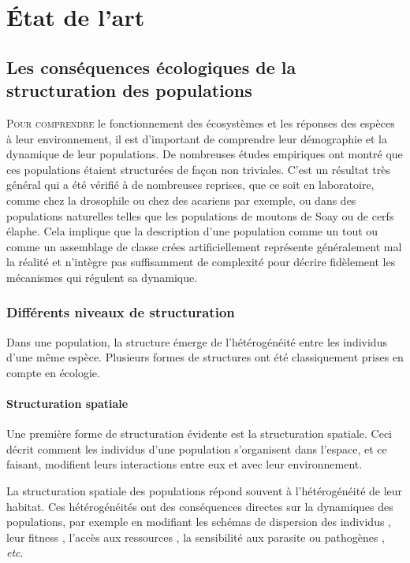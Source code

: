 \chapter{État de l'art}

\section{Les conséquences écologiques de la structuration des populations}

\lettrine[lines=3]{P}{our comprendre} le fonctionnement des écosystèmes et les
réponses des espèces à leur environnement, il est d'important de comprendre leur démographie et la
dynamique de leur populations. De nombreuses études empiriques ont montré que
ces populations étaient structurées de façon non triviales. C'est un 
résultat très général qui a été vérifié à de nombreuses reprises, que ce soit en
laboratoire, comme chez la drosophile ou chez des acariens par exemple, ou dans
des populations naturelles telles que les populations de moutons de Soay ou de cerfs
élaphe. 
Cela implique que la description d'une population comme un tout ou comme
un assemblage de classe crées artificiellement représente généralement mal la
réalité et n'intègre pas suffisamment de complexité pour décrire fidèlement les
mécanismes qui régulent sa dynamique.

\subsection{Différents niveaux de structuration}

Dans une population, la structure émerge de l'hétérogénéité entre les
individus d'une même espèce. Plusieurs formes de structures ont été
classiquement prises en compte en écologie.

\subsubsection{Structuration spatiale}

Une première forme de structuration évidente est la structuration spatiale. Ceci
décrit comment les individus d'une population s'organisent dans l'espace, et ce
faisant, modifient leurs interactions entre eux et avec leur environnement. 

La structuration spatiale des populations répond souvent à l'hétérogénéité de
leur habitat. Ces hétérogénéités ont des conséquences directes sur la dynamiques
des populations, par exemple en modifiant les schémas de dispersion des
individus \autocite{hiebeler2000a}, leur fitness \autocite{zajkac2008a},
l'accès aux ressources \autocite{burger2008a}, la sensibilité aux parasite ou
pathogènes \autocite{su2009a}, \textit{etc}.

